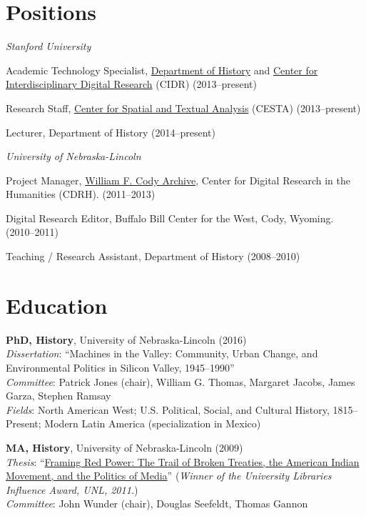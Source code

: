 \section{Positions}\label{positions}

\emph{Stanford University}

Academic Technology Specialist,
\href{http://history.stanford.edu}{Department of History} and
\href{http://library.stanford.edu/research/center-interdisciplinary-digital-research-cidr}{Center
for Interdisciplinary Digital Research} (CIDR) (2013--present)

Research Staff, \href{http://cesta.stanford.edu}{Center for Spatial and
Textual Analysis} (CESTA) (2013--present)

Lecturer, Department of History (2014--present)

\emph{University of Nebraska-Lincoln}

Project Manager, \href{http://codyarchive.org}{William F. Cody Archive},
Center for Digital Research in the Humanities (CDRH). (2011--2013)

Digital Research Editor, Buffalo Bill Center for the West, Cody,
Wyoming. (2010--2011)

Teaching / Research Assistant, Department of History (2008--2010)

\section{Education}\label{education}

\textbf{PhD, History}, University of Nebraska-Lincoln (2016)\\
\emph{Dissertation}: ``Machines in the Valley: Community, Urban Change,
and Environmental Politics in Silicon Valley, 1945--1990''\\
\emph{Committee}: Patrick Jones (chair), William G. Thomas, Margaret
Jacobs, James Garza, Stephen Ramsay\\
\emph{Fields}: North American West; U.S. Political, Social, and Cultural
History, 1815--Present; Modern Latin America (specialization in Mexico)

\textbf{MA, History}, University of Nebraska-Lincoln (2009)\\
\emph{Thesis}:
``\href{http://digitalcommons.unl.edu/historydiss/21/}{Framing Red
Power: The Trail of Broken Treaties, the American Indian Movement, and
the Politics of Media}'' (\emph{Winner of the University Libraries
Influence Award, UNL, 2011.})\\
\emph{Committee}: John Wunder (chair), Douglas Seefeldt, Thomas Gannon

